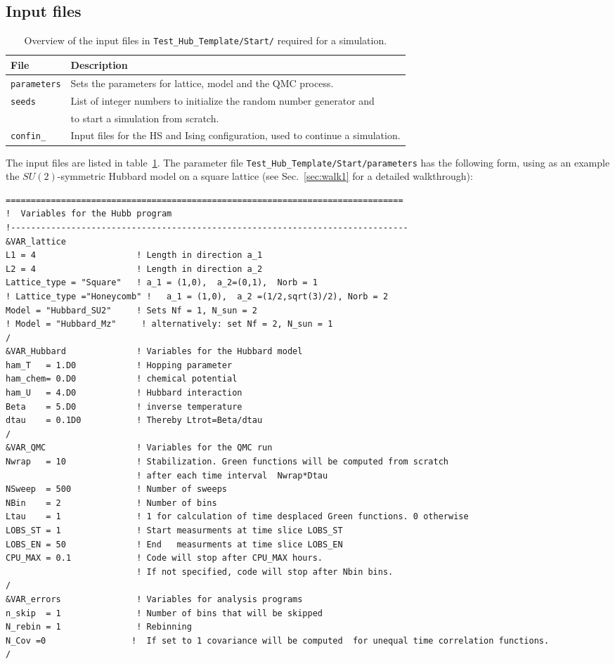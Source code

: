 \subsection{Input files}\label{sec:input}
%
\begin{table}[h]
   \begin{tabular}{l l}
   File & Description \\\hline
  \texttt{parameters} &  Sets the parameters for lattice, model and the QMC process.\\
  \texttt{seeds} & List of integer numbers to initialize the random number generator and \\
   & to start a simulation from scratch.\\
  \texttt{confin\_<thread number>} & Input files for the HS and Ising configuration, used to continue a simulation. 
   \end{tabular}
   \caption{Overview of the input files in \texttt{Test\_Hub\_Template/Start/} required for a simulation. \label{table:input}}
\end{table}
%
The input files are listed in table~\ref{table:input}. 
The parameter file \texttt{Test\_Hub\_Template/Start/parameters} has the following form, 
using as an example  the $SU(2)$-symmetric Hubbard model on a square lattice (see Sec.~\ref{sec:walk1} for a detailed walkthrough):
%
\begin{lstlisting} 
===============================================================================
!  Variables for the Hubb program
!-------------------------------------------------------------------------------
&VAR_lattice
L1 = 4                    ! Length in direction a_1
L2 = 4                    ! Length in direction a_2
Lattice_type = "Square"	  ! a_1 = (1,0),  a_2=(0,1),  Norb = 1
! Lattice_type ="Honeycomb" !   a_1 = (1,0),  a_2 =(1/2,sqrt(3)/2), Norb = 2
Model = "Hubbard_SU2"     ! Sets Nf = 1, N_sun = 2
! Model = "Hubbard_Mz"     ! alternatively: set Nf = 2, N_sun = 1
/
&VAR_Hubbard              ! Variables for the Hubbard model
ham_T   = 1.D0            ! Hopping parameter
ham_chem= 0.D0            ! chemical potential
ham_U   = 4.D0            ! Hubbard interaction
Beta    = 5.D0            ! inverse temperature
dtau    = 0.1D0           ! Thereby Ltrot=Beta/dtau
/
&VAR_QMC                  ! Variables for the QMC run
Nwrap   = 10              ! Stabilization. Green functions will be computed from scratch 
                          ! after each time interval  Nwrap*Dtau
NSweep  = 500             ! Number of sweeps
NBin    = 2               ! Number of bins
Ltau    = 1               ! 1 for calculation of time desplaced Green functions. 0 otherwise
LOBS_ST = 1               ! Start measurments at time slice LOBS_ST
LOBS_EN = 50              ! End   measurments at time slice LOBS_EN
CPU_MAX = 0.1             ! Code will stop after CPU_MAX hours. 
                          ! If not specified, code will stop after Nbin bins.
/                          
&VAR_errors               ! Variables for analysis programs
n_skip  = 1               ! Number of bins that will be skipped
N_rebin = 1               ! Rebinning  
N_Cov =0                 !  If set to 1 covariance will be computed  for unequal time correlation functions.                   
/            
\end{lstlisting}
